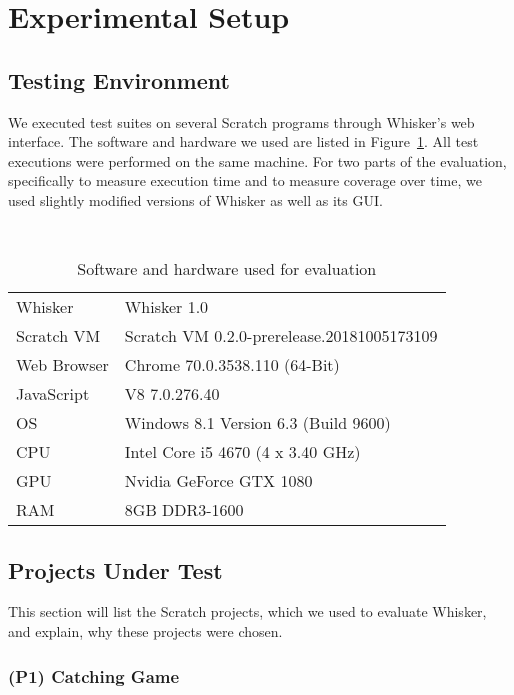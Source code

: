 \section{Experimental Setup}
\label{sec:experimental_setup}

\subsection{Testing Environment}

We executed test suites on several Scratch programs through Whisker's web interface.
The software and hardware we used are listed in Figure~\ref{tab:evaluation_setup}.
All test executions were performed on the same machine.
For two parts of the evaluation,
specifically to measure execution time and to measure coverage over time,
we used slightly modified versions of Whisker as well as its GUI.

\begin{table}[htpb]
    \centering
    \scriptsize \tt
    \begin{tabular}{ll}
        \toprule
        Whisker     & Whisker 1.0 \\
        Scratch VM  & Scratch VM 0.2.0-prerelease.20181005173109 \\
        Web Browser & Chrome 70.0.3538.110 (64-Bit) \\
        JavaScript  & V8 7.0.276.40 \\
        OS          & Windows 8.1 Version 6.3 (Build 9600) \\
        CPU         & Intel Core i5 4670 (4 x  3.40 GHz) \\
        GPU         & Nvidia GeForce GTX 1080 \\
        RAM         & 8GB DDR3-1600 \\
        \bottomrule
    \end{tabular}
    \caption{Software and hardware used for evaluation}
    \label{tab:evaluation_setup}
\end{table}

\subsection{Projects Under Test}

This section will list the Scratch projects,
which we used to evaluate Whisker,
and explain, why these projects were chosen.

\subsubsection{(P1) Catching Game}

